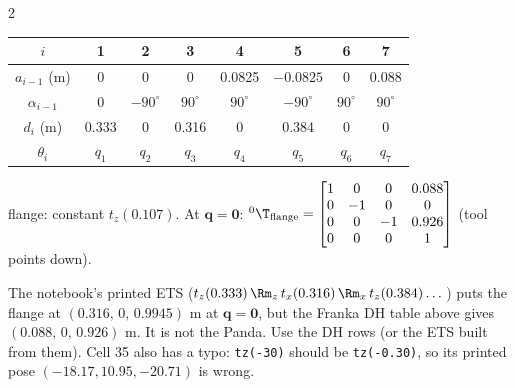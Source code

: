 \begin{multicols}{2}
\begin{fbx}
\begin{center}\renewcommand{\arraystretch}{1.05}\begin{tabular}{@{}c|ccccccc@{}}$i$&1&2&3&4&5&6&7\\\hline
$a_{i-1}$ (m)&0&0&0&0.0825&$-0.0825$&0&0.088\\
$\alpha_{i-1}$&0&$-90^\circ$&$90^\circ$&$90^\circ$&$-90^\circ$&$90^\circ$&$90^\circ$\\
$d_i$ (m)&0.333&0&0.316&0&0.384&0&0\\
$\theta_i$&$q_1$&$q_2$&$q_3$&$q_4$&$q_5$&$q_6$&$q_7$\end{tabular}\end{center}
flange: constant $t_z(0.107)$. At $\mathbf q=\mathbf 0$: ${}^0\T_{\text{flange}}=\begin{bmatrix}1&0&0&0.088\\0&-1&0&0\\0&0&-1&0.926\\0&0&0&1\end{bmatrix}$ (tool points down). \chk
{}
\end{fbx}
\begin{slideerr}
The notebook's printed ETS ($t_z(0.333)\,\Rm_z\,t_x(0.316)\,\Rm_x\,t_z(0.384)\dots$) puts the flange at $(0.316,\,0,\,0.9945)$ m at $\mathbf q=\mathbf 0$, but the Franka DH table above gives $(0.088,\,0,\,0.926)$ m. It is not the Panda. Use the DH rows (or the ETS built from them). Cell 35 also has a typo: \texttt{tz(-30)} should be \texttt{tz(-0.30)}, so its printed pose $(-18.17,10.95,-20.71)$ is wrong. \chk
\end{slideerr}


\end{multicols}
